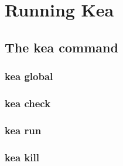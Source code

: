 \chapter{Running Kea}

\section{The kea command}

\subsection{kea global}
\subsection{kea check}
\subsection{kea run}
\subsection{kea kill}
